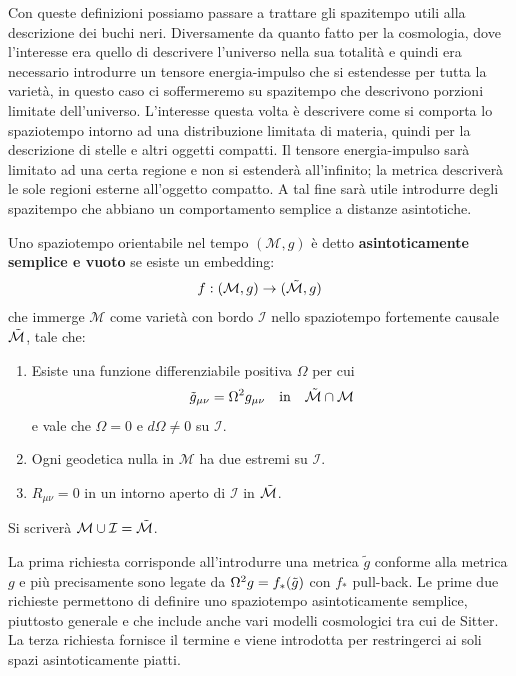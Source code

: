 Con queste definizioni possiamo passare a trattare gli spazitempo utili alla descrizione dei buchi neri. Diversamente da quanto fatto per la cosmologia, dove l'interesse era quello di descrivere l'universo nella sua totalità e quindi era necessario introdurre un tensore energia-impulso che si estendesse per tutta la varietà, in questo caso ci soffermeremo su spazitempo che descrivono porzioni limitate dell'universo. L'interesse questa volta è descrivere come si comporta lo spaziotempo intorno ad una distribuzione limitata di materia, quindi per la descrizione di stelle e altri oggetti compatti. Il tensore energia-impulso sarà limitato ad una certa regione e non si estenderà all'infinito; la metrica descriverà le sole regioni esterne all'oggetto compatto. A tal fine sarà utile introdurre degli spazitempo che abbiano un comportamento semplice a distanze asintotiche.
\begin{definizione}
Uno spaziotempo orientabile nel tempo $(\mathcal{M}, g)$ è detto \textbf{asintoticamente semplice e vuoto} se esiste un embedding:
\begin{equation*}
    f: (\mathcal{M},g) \rightarrow (\Tilde{\mathcal{M}},g)\end{equation*}
che immerge $\mathcal{M}$  come varietà con bordo $\mathcal{I}$ nello spaziotempo fortemente causale $\Tilde{\mathcal{M}}$, tale che:
\begin{enumerate}
    \item Esiste una funzione differenziabile positiva $\Omega$ per cui
\begin{equation*}
    \Tilde{g}_{\mu\nu} = \Omega^2 g_{\mu\nu} \ \ \textrm{ in } \ \ \Tilde{\mathcal{M}}\cap \mathcal{M}
\end{equation*}
e vale che $\Omega = 0$ e $d\Omega \neq 0$ su $\mathcal{I}$.
\item Ogni geodetica nulla in $\mathcal{M}$ ha due estremi su $\mathcal{I}$.
\item $R_{\mu\nu}=0$ in un intorno aperto di $\mathcal{I}$ in $\Tilde{\mathcal{M}}$.
\end{enumerate}
Si scriverà $\mathcal{M}\cup \mathcal{I} = \Tilde{\mathcal{M}}$.
\end{definizione}
La prima richiesta corrisponde all'introdurre una metrica $\tilde{g}$ conforme alla metrica $g$ e più precisamente sono legate da $\Omega^2 g = f_*(\Tilde{g})$ con $f_*$ pull-back.
Le prime due richieste permettono di definire uno spaziotempo asintoticamente semplice, piuttosto generale e che include anche vari modelli cosmologici tra cui de Sitter. La terza richiesta fornisce il termine  e viene introdotta per restringerci ai soli spazi asintoticamente piatti.

